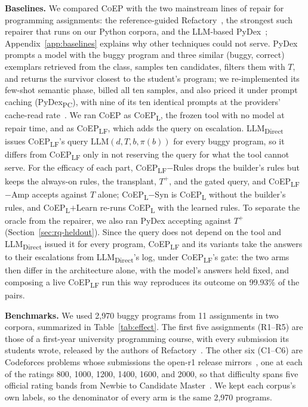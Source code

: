 \documentclass[acmsmall,screen,review,anonymous,nonacm]{acmart}
\newcommand{\tool}{\textsc{CoEP}\xspace}
\newcommand{\coepL}{\textsc{CoEP}\textsubscript{L}\xspace}
\newcommand{\coepLF}{\textsc{CoEP}\textsubscript{LF}\xspace}
\newcommand{\coepNS}{\textsc{CoEP}\textsubscript{L}$-$Syn\xspace}
\newcommand{\coepLL}{\textsc{CoEP}\textsubscript{L}$+$Learn\xspace}
\newcommand{\pydexPC}{PyDex\textsubscript{PC}\xspace}
\newcommand{\direct}{LLM\textsubscript{Direct}\xspace}
\begin{document}
\textbf{Baselines.} We compared \tool with the two mainstream lines of repair for programming assignments: the reference-guided Refactory~\cite{hu2019re}, the strongest such repairer that runs on our Python corpora, and the LLM-based PyDex~\cite{zhang2024pydex}; Appendix~\ref{app:baselines} explains why other techniques could not serve. PyDex prompts a model with the buggy program and three similar (buggy, correct) exemplars retrieved from the class, samples ten candidates, filters them with $T$, and returns the survivor closest to the student's program; we re-implemented its few-shot semantic phase, billed all ten samples, and also priced it under prompt caching (\pydexPC), with nine of its ten identical prompts at the providers' cache-read rate~\cite{anthropiccaching,openaicaching}. We ran \tool as \coepL, the frozen tool with no model at repair time, and as \coepLF, which adds the query on escalation. \direct issues \coepLF's query $\mathrm{LLM}(d, T, b, \pi(b))$ for every buggy program, so it differs from \coepLF only in not reserving the query for what the tool cannot serve. For the efficacy of each part, \coepLF$-$Rules drops the builder's rules but keeps the always-on rules, the transplant, $T^{+}$, and the gated query, and \coepLF$-$Amp accepts against $T$ alone; \coepNS is \coepL without the builder's rules, and \coepLL re-runs \coepL with the learned rules. To separate the oracle from the repairer, we also ran PyDex accepting against $T^{+}$ (Section~\ref{sec:rq-heldout}). Since the query does not depend on the tool and \direct issued it for every program, \coepLF and its variants take the answers to their escalations from \direct's log, under \coepLF's gate: the two arms then differ in the architecture alone, with the model's answers held fixed, and composing a live \coepLF run this way reproduces its outcome on 99.93\% of the pairs.

\textbf{Benchmarks.} We used 2{,}970 buggy programs from 11 assignments in two corpora, summarized in Table~\ref{tab:effect}. The first five assignments (R1--R5) are those of a first-year university programming course, with every submission its students wrote, released by the authors of Refactory~\cite{hu2019re}. The other six (C1--C6) are Codeforces problems whose submissions the open-r1 release mirrors~\cite{penedo2025codeforces}, one at each of the ratings 800, 1000, 1200, 1400, 1600, and 2000, so that difficulty spans five official rating bands from Newbie to Candidate Master~\cite{cfratings}. We kept each corpus's own labels, so the denominator of every arm is the same 2{,}970 programs.
\end{document}
